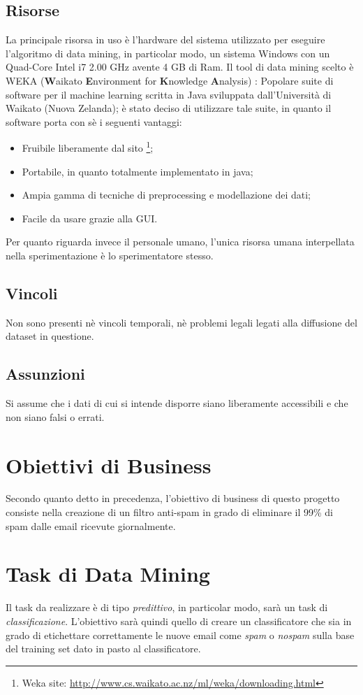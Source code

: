\subsection{Risorse}
La principale risorsa in uso è l'hardware del sistema utilizzato per eseguire l'algoritmo di data mining, in particolar modo, un sistema Windows con un Quad-Core Intel i7 2.00 GHz avente 4 GB di Ram.
Il tool di data mining scelto è WEKA (\textbf{W}aikato \textbf{E}nvironment for \textbf{K}nowledge \textbf{A}nalysis) \cite{WEKA}:
Popolare suite di software per il machine learning scritta in Java sviluppata dall'Università di Waikato (Nuova Zelanda); è stato deciso di utilizzare tale suite, in quanto il software porta con sè i seguenti vantaggi:
\begin{itemize}
	\item Fruibile liberamente dal sito \footnote{Weka site: \url{http://www.cs.waikato.ac.nz/ml/weka/downloading.html}};
    \item Portabile, in quanto totalmente implementato in java;
    \item Ampia gamma di tecniche di preprocessing e modellazione dei dati;
    \item Facile da usare grazie alla GUI.
\end{itemize}
Per quanto riguarda invece il personale umano, l'unica risorsa umana interpellata nella sperimentazione è lo sperimentatore stesso.
\subsection{Vincoli}
	Non sono presenti nè vincoli temporali, nè problemi legali legati alla diffusione del dataset in questione.
\subsection{Assunzioni}
	Si assume che i dati di cui si intende disporre siano liberamente accessibili e che non siano falsi o errati.
\section{Obiettivi di Business}
	Secondo quanto detto in precedenza, l'obiettivo di business di questo progetto consiste nella creazione di un filtro anti-spam in grado di eliminare il 99\% di spam dalle email ricevute giornalmente.
\section{Task di Data Mining}
	\label{task}
	Il task da realizzare è di tipo \textit{predittivo}, in particolar modo, sarà un task di \textit{classificazione}. L'obiettivo sarà quindi quello di creare un classificatore che sia in grado di etichettare correttamente le nuove email come \textit{spam} o \textit{nospam} sulla base del training set dato in pasto al classificatore. 

